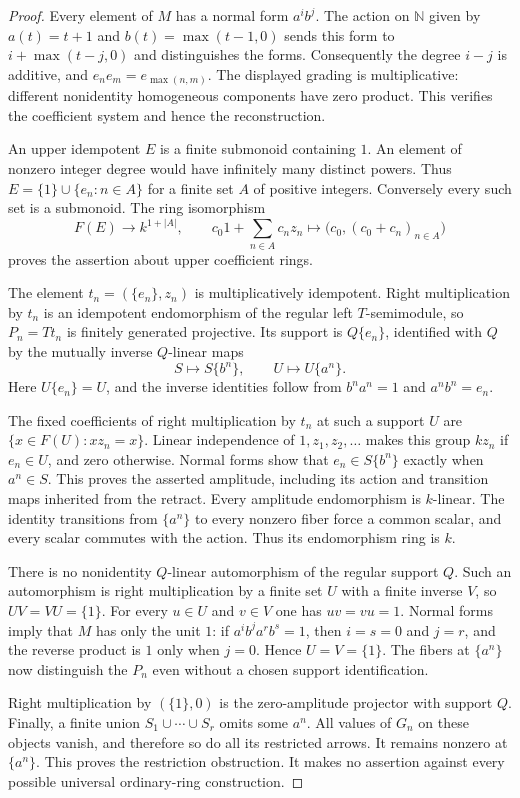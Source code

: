 \begin{proof}
Every element of $M$ has a normal form $a^ib^j$. The action on
$\mathbb N$ given by $a(t)=t+1$ and $b(t)=\max(t-1,0)$ sends
this form to $i+\max(t-j,0)$ and distinguishes the forms.
Consequently the degree $i-j$ is additive, and
$e_ne_m=e_{\max(n,m)}$. The displayed grading is multiplicative:
different nonidentity homogeneous components have zero product.
This verifies the coefficient system and hence the reconstruction.

An upper idempotent $E$ is a finite submonoid containing $1$.
An element of nonzero integer degree would have infinitely many
distinct powers. Thus $E=\{1\}\cup\{e_n:n\in A\}$ for a
finite set $A$ of positive integers. Conversely every such set
is a submonoid. The ring isomorphism
\[
 F(E)\longrightarrow k^{1+|A|},\qquad
 c_0 1+\sum_{n\in A}c_nz_n\longmapsto
       \bigl(c_0,(c_0+c_n)_{n\in A}\bigr)
\]
proves the assertion about upper coefficient rings.

The element $t_n=(\{e_n\},z_n)$ is multiplicatively idempotent.
Right multiplication by $t_n$ is an idempotent endomorphism of
the regular left $T$-semimodule, so $P_n=Tt_n$ is finitely
generated projective. Its support is $Q\{e_n\}$, identified
with $Q$ by the mutually inverse $Q$-linear maps
\[
 S\longmapsto S\{b^n\},\qquad
 U\longmapsto U\{a^n\}.
\]
Here $U\{e_n\}=U$, and the inverse identities follow from
$b^na^n=1$ and $a^nb^n=e_n$.

The fixed coefficients of right multiplication by $t_n$ at
such a support $U$ are $\{x\in F(U):xz_n=x\}$. Linear
independence of $1,z_1,z_2,\ldots$ makes this group $kz_n$
if $e_n\in U$, and zero otherwise. Normal forms show that
$e_n\in S\{b^n\}$ exactly when $a^n\in S$. This proves
the asserted amplitude, including its action and transition
maps inherited from the retract. Every amplitude endomorphism
is $k$-linear. The identity transitions from $\{a^n\}$ to
every nonzero fiber force a common scalar, and every scalar
commutes with the action. Thus its endomorphism ring is $k$.

There is no nonidentity $Q$-linear automorphism of the regular
support $Q$. Such an automorphism is right multiplication by
a finite set $U$ with a finite inverse $V$, so
$UV=VU=\{1\}$. For every $u\in U$ and $v\in V$ one has
$uv=vu=1$. Normal forms imply that $M$ has only the unit $1$:
if $a^ib^j a^rb^s=1$, then $i=s=0$ and $j=r$, and the
reverse product is $1$ only when $j=0$. Hence
$U=V=\{1\}$. The fibers at $\{a^n\}$ now distinguish
the $P_n$ even without a chosen support identification.

Right multiplication by $(\{1\},0)$ is the zero-amplitude
projector with support $Q$. Finally, a finite union
$S_1\cup\cdots\cup S_r$ omits some $a^n$. All values of
$G_n$ on these objects vanish, and therefore so do all its
restricted arrows. It remains nonzero at $\{a^n\}$. This
proves the restriction obstruction. It makes no assertion
against every possible universal ordinary-ring construction.
\end{proof}

